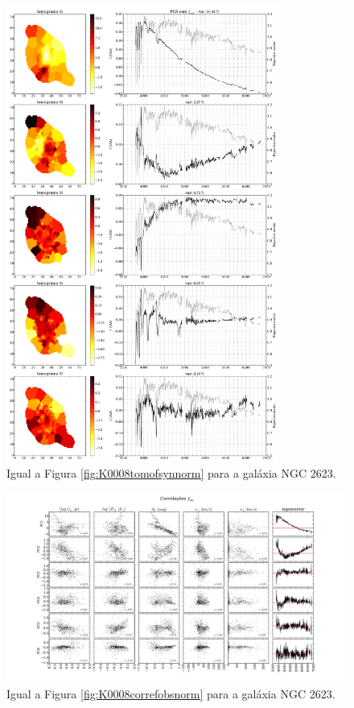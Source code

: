 \begin{figure}
    \includegraphics[width=0.8\textwidth]{figuras/K0213-tomo-syn-norm.pdf}
    \caption[Tomogramas de 1 a 5 para o cubo $f_{syn}$ - NGC 2623.]
    {Igual a Figura \ref{fig:K0008tomofsynnorm} para a galáxia NGC 2623.}
    \label{fig:K0213tomofsynnorm}
\end{figure}

\begin{figure}
    \includegraphics[width=1.2\textwidth, angle=-90]{figuras/K0213-correl-f_obs_norm-PCvsPhys.pdf}
	\caption[Correlações PCs vs. par\^ametros f\'isicos - $f_{obs}$ - NGC 2623.]
	{Igual a Figura \ref{fig:K0008correfobsnorm} para a galáxia NGC 2623.}
    \label{fig:K0213correfobsnorm}
\end{figure}


